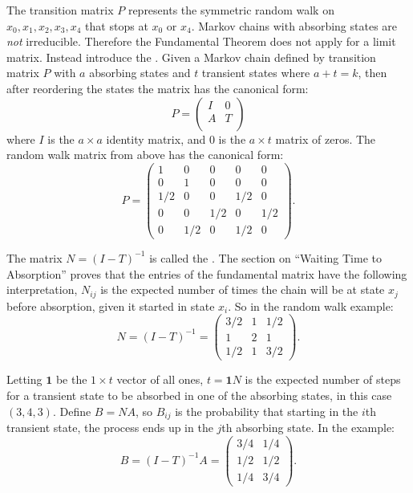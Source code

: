 \documentclass[12pt]{article}
\begin{document}
The transition matrix \( P \) represents the symmetric
random walk on \( {x_0,x_1,x_2,x_3,x_4}
\) that stops at \( x_0 \) or \( x_4 \).  Markov chains with absorbing
states are \emph{not} irreducible.  Therefore the Fundamental Theorem does not
apply for a limit matrix.  Instead introduce the .%
Given a Markov chain defined by transition matrix \( P \) with \( a \)
absorbing states and \( t \) transient states where \( a + t = k \),
then after reordering the states the matrix has the canonical form:
\[
    P=
    \begin{pmatrix}
        I & 0 \\
        A & T \\
    \end{pmatrix}
\] where \( I \) is the \( a\times a \) identity matrix, and \( 0 \) is
the \( a\times t \) matrix of zeros.  The random walk matrix from above
has the canonical form:
\[
    P =
    \begin{pmatrix}
        1 & 0 & 0 & 0 & 0 \\
        0 & 1 & 0 & 0 & 0\\
        1/2 & 0 & 0 & 1/2 & 0 \\
        0 & 0 & 1/2 & 0 & 1/2 \\
        0 & 1/2 & 0 & 1/2 & 0
    \end{pmatrix}
    .
\]

The matrix \( N=(I-T)^{-1} \) is called the .%
The section on ``Waiting Time to Absorption'' proves that the
entries of the fundamental matrix have the following interpretation,
\( N_{ij} \) is the expected number of times the chain will be
at state \( x_j \) before absorption, given it started in state \( x_i \).
So in the random walk example:
\[
    N = (I-T)^{-1} =
    \begin{pmatrix}
        3/2 & 1 & 1/2 \\
        1 & 2 & 1\\
        1/2 & 1 & 3/2
    \end{pmatrix}
    .
\]

Letting \( \mathbf{1} \) be the \( 1 \times t \) vector of all ones, \(
t= \mathbf {1} N \) is the expected number of steps for a transient
state to be absorbed in one of the absorbing states, in this case \( (3,4,3)
\).  Define \( B=NA \), so \( B_{ij} \) is the probability that starting
in the \( i \)th transient state, the process ends up in the \( j \)th
absorbing state.  In the example:
\[
    B = (I-T)^{-1}A =
    \begin{pmatrix}
        3/4 & 1/4 \\
        1/2 & 1/2 \\
        1/4 & 3/4
    \end{pmatrix}
    .
\]
\end{document}
